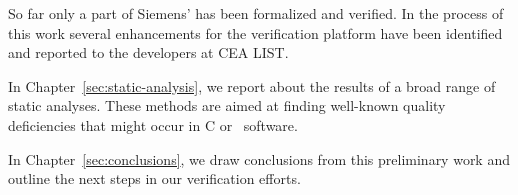 So far only a part of Siemens' \bitwalker has been formalized and verified.
In the process of this work several enhancements for the \framac verification platform
have been identified and reported to the developers at {CEA LIST}.

In Chapter~\ref{sec:static-analysis}, we report about the results of a broad range
of static analyses. 
These methods are aimed at finding well-known quality deficiencies that
might occur in C or \CC\ software.

In Chapter~\ref{sec:conclusions}, we draw conclusions from this preliminary work
and outline the next steps in our verification efforts.

